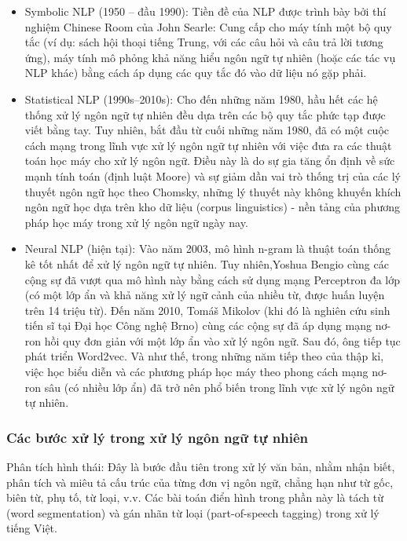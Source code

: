 \begin{itemize}
    \item Symbolic NLP (1950 – đầu 1990): Tiền đề của NLP được trình bày bởi thí nghiệm Chinese Room của John Searle: Cung cấp cho máy tính một bộ quy tắc (ví dụ: sách hội thoại tiếng Trung, với các câu hỏi và câu trả lời tương ứng), máy tính mô phỏng khả năng hiểu ngôn ngữ tự nhiên (hoặc các tác vụ NLP khác) bằng cách áp dụng các quy tắc đó vào dữ liệu nó gặp phải.
    \item Statistical NLP (1990s–2010s): Cho đến những năm 1980, hầu hết các hệ thống xử lý ngôn ngữ tự nhiên đều dựa trên các bộ quy tắc phức tạp được viết bằng tay. Tuy nhiên, bắt đầu từ cuối những năm 1980, đã có một cuộc cách mạng trong lĩnh vực xử lý ngôn ngữ tự nhiên với việc đưa ra các thuật toán học máy cho xử lý ngôn ngữ. Điều này là do sự gia tăng ổn định về sức mạnh tính toán (định luật Moore) và sự giảm dần vai trò thống trị của các lý thuyết ngôn ngữ học theo Chomsky, những lý thuyết này không khuyến khích ngôn ngữ học dựa trên kho dữ liệu (corpus linguistics) - nền tảng của phương pháp học máy trong xử lý ngôn ngữ ngày nay.
    \item Neural NLP (hiện tại): Vào năm 2003, mô hình n-gram là thuật toán thống kê tốt nhất để xử lý ngôn ngữ tự nhiên. Tuy nhiên,Yoshua Bengio cùng các cộng sự đã vượt qua mô hình này bằng cách sử dụng mạng Perceptron đa lớp (có một lớp ẩn và khả năng xử lý ngữ cảnh của nhiều từ, được huấn luyện trên 14 triệu từ). Đến năm 2010, Tomáš Mikolov (khi đó là nghiên cứu sinh tiến sĩ tại Đại học Công nghệ Brno) cùng các cộng sự đã áp dụng mạng nơ-ron hồi quy đơn giản với một lớp ẩn vào xử lý ngôn ngữ. Sau đó, ông tiếp tục phát triển Word2vec. Và như thế, trong những năm tiếp theo của thập kỉ, việc học biểu diễn và các phương pháp học máy theo phong cách mạng nơ-ron sâu (có nhiều lớp ẩn) đã trở nên phổ biến trong lĩnh vực xử lý ngôn ngữ tự nhiên. 
\end{itemize}

\subsubsection{Các bước xử lý trong xử lý ngôn ngữ tự nhiên}

Phân tích hình thái: Đây là bước đầu tiên trong xử lý văn bản, nhằm nhận biết, phân tích và miêu tả cấu trúc của từng đơn vị ngôn ngữ, chẳng hạn như từ gốc, biên từ, phụ tố, từ loại, v.v. Các bài toán điển hình trong phần này là tách từ (word segmentation) và gán nhãn từ loại (part-of-speech tagging) trong xử lý tiếng Việt. 

